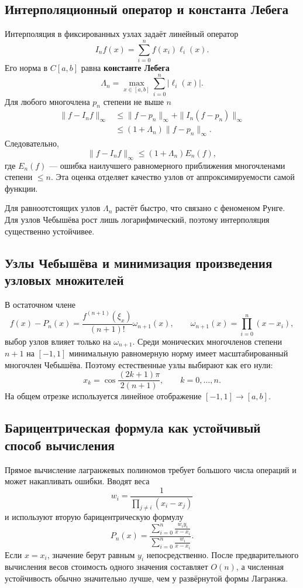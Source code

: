 \subsection{Интерполяционный оператор и константа Лебега}

Интерполяция в фиксированных узлах задаёт линейный оператор
\[
    I_nf(x)=\sum_{i=0}^{n}f(x_i)\ell_i(x).
\]
Его норма в $C[a,b]$ равна \textbf{константе Лебега}
\[
    \Lambda_n
    =\max_{x\in[a,b]}
      \sum_{i=0}^{n}|\ell_i(x)|.
\]
Для любого многочлена $p_n$ степени не выше $n$
\[
\begin{aligned}
    \|f-I_nf\|_\infty
    &\le \|f-p_n\|_\infty
      +\|I_n(f-p_n)\|_\infty\\
    &\le (1+\Lambda_n)\|f-p_n\|_\infty.
\end{aligned}
\]
Следовательно,
\[
    \|f-I_nf\|_\infty
    \le (1+\Lambda_n)E_n(f),
\]
где $E_n(f)$ --- ошибка наилучшего равномерного приближения многочленами степени
$\le n$. Эта оценка отделяет качество узлов от аппроксимируемости самой функции.

Для равноотстоящих узлов $\Lambda_n$ растёт быстро, что связано с феноменом Рунге.
Для узлов Чебышёва рост лишь логарифмический, поэтому интерполяция существенно устойчивее.

\subsection{Узлы Чебышёва и минимизация произведения узловых множителей}

В остаточном члене
\[
    f(x)-P_n(x)
    =\frac{f^{(n+1)}(\xi_x)}{(n+1)!}\omega_{n+1}(x),
    \qquad
    \omega_{n+1}(x)=\prod_{i=0}^{n}(x-x_i),
\]
выбор узлов влияет только на $\omega_{n+1}$. Среди монических многочленов степени
$n+1$ на $[-1,1]$ минимальную равномерную норму имеет масштабированный многочлен
Чебышёва. Поэтому естественные узлы выбирают как его нули:
\[
    x_k=\cos\frac{(2k+1)\pi}{2(n+1)},
    \qquad k=0,\ldots,n.
\]
На общем отрезке используется линейное отображение $[-1,1]\to[a,b]$.

\subsection{Барицентрическая формула как устойчивый способ вычисления}

Прямое вычисление лагранжевых полиномов требует большого числа операций и может
накапливать ошибки. Вводят веса
\[
    w_i=\frac{1}{\prod_{j\ne i}(x_i-x_j)}
\]
и используют вторую барицентрическую формулу
\[
    P_n(x)=
    \frac{\displaystyle\sum_{i=0}^{n}\frac{w_i y_i}{x-x_i}}
         {\displaystyle\sum_{i=0}^{n}\frac{w_i}{x-x_i}}.
\]
Если $x=x_i$, значение берут равным $y_i$ непосредственно. После предварительного
вычисления весов стоимость одного значения составляет $O(n)$, а численная устойчивость
обычно значительно лучше, чем у развёрнутой формы Лагранжа.

